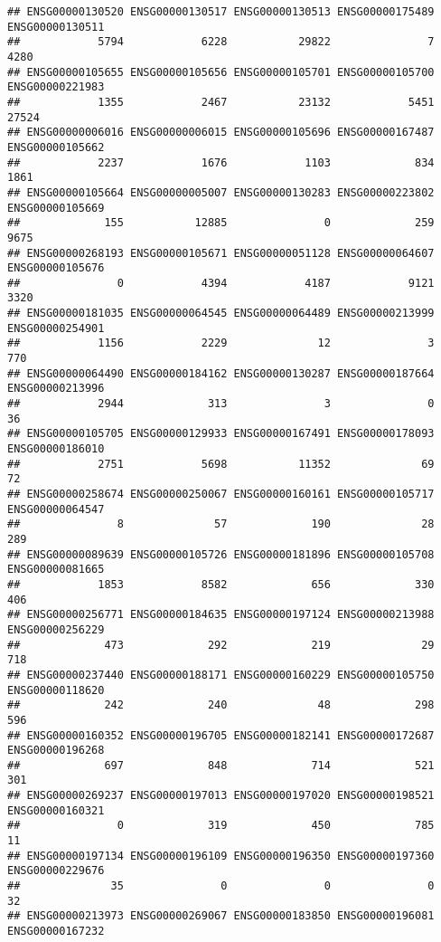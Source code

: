 \documentclass[
]{article}
\begin{document}
\begin{verbatim}
## ENSG00000130520 ENSG00000130517 ENSG00000130513 ENSG00000175489 ENSG00000130511 
##            5794            6228           29822               7            4280 
## ENSG00000105655 ENSG00000105656 ENSG00000105701 ENSG00000105700 ENSG00000221983 
##            1355            2467           23132            5451           27524 
## ENSG00000006016 ENSG00000006015 ENSG00000105696 ENSG00000167487 ENSG00000105662 
##            2237            1676            1103             834            1861 
## ENSG00000105664 ENSG00000005007 ENSG00000130283 ENSG00000223802 ENSG00000105669 
##             155           12885               0             259            9675 
## ENSG00000268193 ENSG00000105671 ENSG00000051128 ENSG00000064607 ENSG00000105676 
##               0            4394            4187            9121            3320 
## ENSG00000181035 ENSG00000064545 ENSG00000064489 ENSG00000213999 ENSG00000254901 
##            1156            2229              12               3             770 
## ENSG00000064490 ENSG00000184162 ENSG00000130287 ENSG00000187664 ENSG00000213996 
##            2944             313               3               0              36 
## ENSG00000105705 ENSG00000129933 ENSG00000167491 ENSG00000178093 ENSG00000186010 
##            2751            5698           11352              69              72 
## ENSG00000258674 ENSG00000250067 ENSG00000160161 ENSG00000105717 ENSG00000064547 
##               8              57             190              28             289 
## ENSG00000089639 ENSG00000105726 ENSG00000181896 ENSG00000105708 ENSG00000081665 
##            1853            8582             656             330             406 
## ENSG00000256771 ENSG00000184635 ENSG00000197124 ENSG00000213988 ENSG00000256229 
##             473             292             219              29             718 
## ENSG00000237440 ENSG00000188171 ENSG00000160229 ENSG00000105750 ENSG00000118620 
##             242             240              48             298             596 
## ENSG00000160352 ENSG00000196705 ENSG00000182141 ENSG00000172687 ENSG00000196268 
##             697             848             714             521             301 
## ENSG00000269237 ENSG00000197013 ENSG00000197020 ENSG00000198521 ENSG00000160321 
##               0             319             450             785              11 
## ENSG00000197134 ENSG00000196109 ENSG00000196350 ENSG00000197360 ENSG00000229676 
##              35               0               0               0              32 
## ENSG00000213973 ENSG00000269067 ENSG00000183850 ENSG00000196081 ENSG00000167232 

\end{verbatim}
\end{document}
